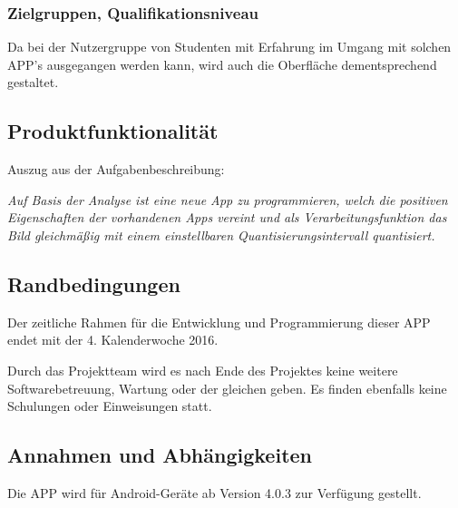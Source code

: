 \subsubsection{Zielgruppen, Qualifikationsniveau}

Da bei der Nutzergruppe von Studenten mit Erfahrung im Umgang mit solchen APP's ausgegangen werden kann, wird auch die Oberfläche dementsprechend gestaltet.

\subsection{\textbf{Produktfunktionalität}}

Auszug aus der Aufgabenbeschreibung:

\textit{\glqq
Auf Basis der Analyse ist eine neue App zu programmieren,
welch die positiven Eigenschaften der vorhandenen Apps vereint und als Verarbeitungsfunktion
das Bild gleichmäßig mit einem einstellbaren Quantisierungsintervall quantisiert.\grqq
} 

\subsection{\textbf{Randbedingungen}}

Der zeitliche Rahmen für die Entwicklung und Programmierung dieser APP endet mit der 4. Kalenderwoche 2016.

Durch das Projektteam wird es nach Ende des Projektes keine weitere Softwarebetreuung, Wartung oder der gleichen geben. Es finden ebenfalls keine Schulungen oder Einweisungen statt.

\subsection{\textbf{Annahmen und Abhängigkeiten}}

Die APP wird für Android-Geräte ab Version 4.0.3 zur Verfügung gestellt.

%

%
%

